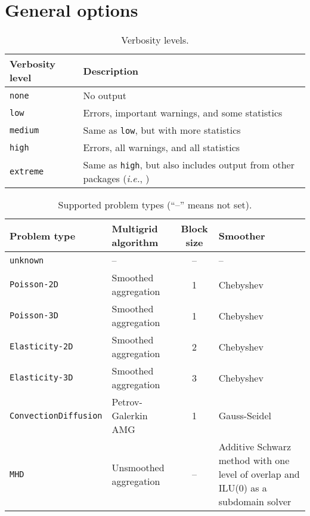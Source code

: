 \section{General options}
\label{sec:options_general}

\begin{table}[h!]
  \begin{center}
    \begin{tabular}{p{3cm} p{12cm}}
      \toprule
      Verbosity level           & Description \\
      \midrule
      \verb!none!               & No output \\
      \verb!low!                & Errors, important warnings, and some statistics \\
      \verb!medium!             & Same as \verb!low!, but with more statistics \\
      \verb!high!               & Errors, all warnings, and all statistics \\
      \verb!extreme!            & Same as \verb!high!, but also includes output from other packages (\textit{i.e.}, \zoltan{}) \\
      \bottomrule
    \end{tabular}
    \caption{Verbosity levels.}
\label{t:verbosity_types}
  \end{center}
\end{table}

\begin{table}[h!]
  \begin{center}
    \begin{tabular}{p{4.3cm} p{4.3cm} c p{4.5cm}}
      \toprule
      Problem type               & Multigrid algorithm    & Block size  & Smoother \\
      \midrule
      \verb!unknown!             & --                     & --          & -- \\
      \verb!Poisson-2D!          & Smoothed aggregation   & 1           & Chebyshev \\
      \verb!Poisson-3D!          & Smoothed aggregation   & 1           & Chebyshev \\
      \verb!Elasticity-2D!       & Smoothed aggregation   & 2           & Chebyshev \\
      \verb!Elasticity-3D!       & Smoothed aggregation   & 3           & Chebyshev \\
      \verb!ConvectionDiffusion! & Petrov-Galerkin  AMG   & 1           & Gauss-Seidel \\
      \verb!MHD!                 & Unsmoothed aggregation & --          & Additive Schwarz method with one level of overlap and ILU(0) as a subdomain solver \\
      \bottomrule
    \end{tabular}
    \caption{Supported problem types (``--'' means not set).}
\label{t:problem_types}
  \end{center}
\end{table}

